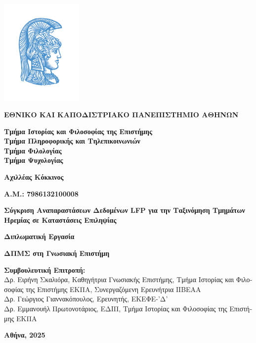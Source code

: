 \documentclass{article}
\begin{document}
\begin{greek}
\begin{titlepage}
	\centering
	\includegraphics[width=0.3\textwidth]{LOGO_UOA COL2.jpg}\\
	\vspace*{1cm}
	
	\textbf{\LARGE ΕΘΝΙΚΟ ΚΑΙ ΚΑΠΟΔΙΣΤΡΙΑΚΟ ΠΑΝΕΠΙΣΤΗΜΙΟ ΑΘΗΝΩΝ}
	
	\vspace{1cm}
	
	\textbf{Τμήμα Ιστορίας και Φιλοσοφίας της Επιστήμης}\\
	\textbf{Τμήμα Πληροφορικής και Τηλεπικοινωνιών}\\
	\textbf{Τμήμα Φιλολογίας}\\
	\textbf{Τμήμα Ψυχολογίας}
	
	\vspace{1cm}
	
	\textbf{\Large Αχιλλέας Κόκκινος}
	
	\vfill
	
	\textbf{\Large Α.Μ.: 7986132100008}
	
	\vfill
	
	{\huge \textbf{Σύγκριση Αναπαραστάσεων Δεδομένων LFP για την Ταξινόμηση Τμημάτων Ηρεμίας σε Καταστάσεις Επιληψίας}}
	
	\vfill
	
	\textbf{\Large Διπλωματική Εργασία}
	
	\vfill
	
	\textbf{\Large ΔΠΜΣ στη Γνωσιακή Επιστήμη}
	
	\vfill
	
	\textbf{Συμβουλευτική Επιτροπή:}\\
	Δρ. Ειρήνη Σκαλιόρα, Καθηγήτρια Γνωσιακής Επιστήμης, Τμήμα Ιστορίας και Φιλοσοφίας της Επιστήμης ΕΚΠΑ, Συνεργαζόμενη Ερευνήτρια ΙΙΒΕΑΑ\\
	Δρ. Γεώργιος Γιαννακόπουλος, Ερευνητής, ΕΚΕΦΕ-’Δ’\\
	Δρ. Εμμανουήλ Πρωτονοτάριος, ΕΔΙΠ, Τμήμα Ιστορίας και Φιλοσοφίας της Επιστήμης ΕΚΠΑ
	
	\vfill
	\textbf{Αθήνα, 2025}
	
\end{titlepage}
\end{greek}
\end{document}
